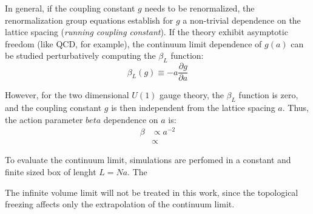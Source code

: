 In general, if the coupling constant $g$ needs to be renormalized,
the renormalization group equations establish for $g$ a non-trivial dependence on the lattice spacing (\emph{running coupling constant}).
If the theory exhibit asymptotic freedom (like QCD, for example), the continuum limit dependence of $g(a)$ can be studied perturbatively computing the $\beta_L$ function:
\[
    \beta_L(g) \equiv -a\frac{\partial g}{\partial a}
\]

However, for the two dimensional $U(1)$ gauge theory, the $\beta_L$ function is zero, and the coupling constant $g$ is then independent from the lattice spacing $a$.
Thus, the action parameter $beta$ dependence on $a$ is:
\begin{equation}
    \begin{aligned}
        \beta &\propto a^{-2} \\
              &\propto 
    \end{aligned}
\end{equation}



To evaluate the continuum limit, simulations are perfomed in a constant and finite sized box of lenght $L=Na$.
The 

The infinite volume limit will not be treated in this work, since the topological freezing affects only the extrapolation of the continuum limit.










